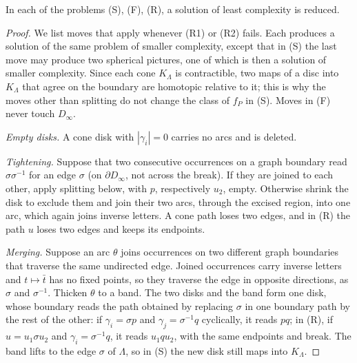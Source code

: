\documentclass[11pt]{article}
\theoremstyle{definition}
\theoremstyle{plain}
\begin{document}
\begin{lemma}\label{lem:reduced}
In each of the problems \textup{(S)}, \textup{(F)}, \textup{(R)}, a solution of least complexity is reduced.
\end{lemma}

\begin{proof}
We list moves that apply whenever (R1) or (R2) fails. Each produces a solution of the same problem of smaller complexity, except that in (S) the last move may produce two spherical pictures, one of which is then a solution of smaller complexity. Since each cone $K_\Lambda$ is contractible, two maps of a disc into $K_\Lambda$ that agree on the boundary are homotopic relative to it; this is why the moves other than splitting do not change the class of $f_P$ in (S). Moves in (F) never touch $D_\infty$.

\emph{Empty disks.} A cone disk with $|\gamma_i|=0$ carries no arcs and is deleted.

\emph{Tightening.} Suppose that two consecutive occurrences on a graph boundary read $\sigma\sigma^{-1}$ for an edge $\sigma$ (on $\partial D_\infty$, not across the break). If they are joined to each other, apply splitting below, with $p$, respectively $u_2$, empty. Otherwise shrink the disk to exclude them and join their two arcs, through the excised region, into one arc, which again joins inverse letters. A cone path loses two edges, and in (R) the path $u$ loses two edges and keeps its endpoints.

\emph{Merging.} Suppose an arc $\theta$ joins occurrences on two different graph boundaries that traverse the same undirected edge. Joined occurrences carry inverse letters and $t\mapsto\bar t$ has no fixed points, so they traverse the edge in opposite directions, as $\sigma$ and $\sigma^{-1}$. Thicken $\theta$ to a band. The two disks and the band form one disk, whose boundary reads the path obtained by replacing $\sigma$ in one boundary path by the rest of the other: if $\gamma_i=\sigma p$ and $\gamma_j=\sigma^{-1}q$ cyclically, it reads $pq$; in (R), if $u=u_1\sigma u_2$ and $\gamma_i=\sigma^{-1}q$, it reads $u_1qu_2$, with the same endpoints and break. The band lifts to the edge $\sigma$ of $\Lambda$, so in (S) the new disk still maps into $K_\Lambda$.


\end{proof}
\end{document}
